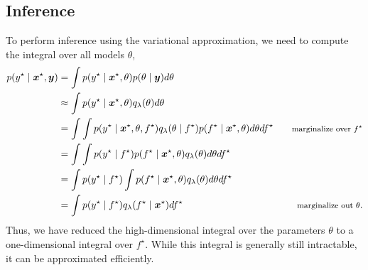 \subsection{Inference}

To perform inference using the variational approximation, we need to compute
the integral over all models $\theta$,
\begin{align*}
  p(y^\star\mid\vec{x}^\star, \vec{y}) &= \int p(y^\star\mid\vec{x}^\star,\theta) p(\theta\mid \vec{y}) d\theta \\
  &\approx \int p(y^\star\mid \vec{x}^\star, \theta) q_{\lambda}(\theta) d\theta \\
  &= \int \int p(y^\star\mid \vec{x}^\star,\theta,f^\star) q_\lambda (\theta\mid f^\star) p(f^\star\mid \vec{x}^\star, \theta) d\theta df^\star & \text{\footnotesize marginalize over $f^\star$} \\
  &= \int \int p(y^\star\mid f^\star) p(f^\star\mid \vec{x}^\star, \theta) q_\lambda (\theta) d\theta df^\star \\
  &= \int p(y^\star\mid f^\star) \int p(f^\star\mid \vec{x}^\star, \theta) q_\lambda (\theta) d\theta df^\star \\
  &= \int p(y^\star\mid f^\star) q_\lambda (f^\star\mid \vec{x}^\star) df^\star & \text{\footnotesize marginalize out $\theta$}
.\end{align*}
Thus, we have reduced the high-dimensional integral over the parameters
$\theta$ to a one-dimensional integral over $f^\star$. While this integral is
generally still intractable, it can be approximated efficiently.
